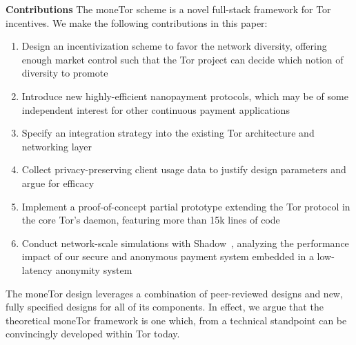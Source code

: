 \textbf{Contributions} The moneTor scheme is a novel full-stack framework for
Tor incentives. We make the following contributions in this paper:

\begin{enumerate}
\item Design an incentivization scheme to favor the network diversity, offering
  enough market control such that the Tor project can decide which notion of
  diversity to promote
\item Introduce new highly-efficient nanopayment protocols, which may be of some
  independent interest for other continuous payment applications
\item Specify an integration strategy into the existing Tor architecture and
  networking layer
\item Collect privacy-preserving client usage data to justify design parameters
  and argue for efficacy
\item Implement a proof-of-concept partial prototype extending the Tor protocol
  in the core Tor's daemon, featuring more than 15k lines of code
\item Conduct network-scale simulations with Shadow~\cite{jansen2011shadow},
  analyzing the performance impact of our secure and anonymous payment system
  embedded in a low-latency anonymity system
\end{enumerate}

The moneTor design leverages a combination of peer-reviewed designs and new,
fully specified designs for all of its components. In effect, we argue that the
theoretical moneTor framework is one which, from a technical standpoint can be
convincingly developed within Tor today.
